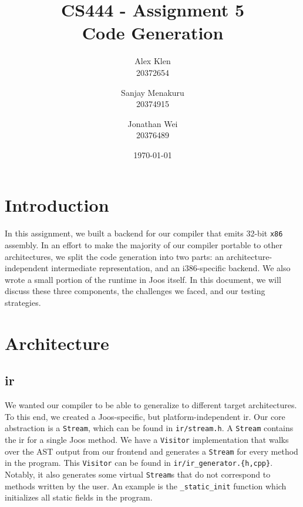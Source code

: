 \documentclass[12pt, titlepage]{article}
\newcommand{\assignmentNumber}{Assignment 5}
\newcommand{\courseName}{CS 444}
\newcommand{\z}[1]{\texttt{#1}}
\begin{document}
\pagestyle{fancyplain}
\thispagestyle{plain}

\fancyhead{}
\fancyfoot{}
\chead{\fancyplain{}{\assignmentNumber}}
\lhead{\fancyplain{}{\courseName}}

\title{CS444 - \assignmentNumber\\Code Generation}
\date{\today}
\author{Alex Klen\\20372654\and Sanjay Menakuru\\20374915\and Jonathan Wei\\20376489}

\maketitle

\section{Introduction}

In this assignment, we built a backend for our compiler that emits 32-bit
\z{x86} assembly. In an effort to make the majority of our compiler portable to
other architectures, we split the code generation into two parts: an
architecture-independent intermediate representation, and an i386-specific
backend. We also wrote a small portion of the runtime in Joos itself. In this
document, we will discuss these three components, the challenges we faced, and
our testing strategies.

\section{Architecture}\label{sec:arch}

\subsection{\ac{ir}}\label{subsec:ir}

We wanted our compiler to be able to generalize to different target
architectures. To this end, we created a Joos-specific, but
platform-independent \ac{ir}. Our core abstraction is a \z{Stream}, which can
be found in \z{ir/stream.h}. A \z{Stream} contains the \ac{ir} for a single
Joos method. We have a \z{Visitor} implementation that walks over the AST
output from our frontend and generates a \z{Stream} for every method in the
program. This \z{Visitor} can be found in \z{ir/ir\_generator.\{h,cpp\}}.
Notably, it also generates some virtual \z{Stream}s that do not correspond to
methods written by the user. An example is the \z{\_static\_init} function
which initializes all static fields in the program. 
\end{document}
